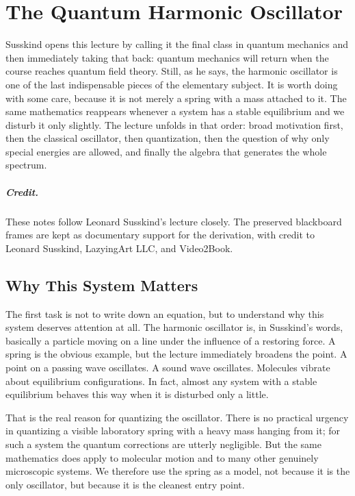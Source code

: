 \chapter{The Quantum Harmonic Oscillator}

Susskind opens this lecture by calling it the final class in quantum mechanics and then immediately taking that back: quantum mechanics will return when the course reaches quantum field theory. Still, as he says, the harmonic oscillator is one of the last indispensable pieces of the elementary subject. It is worth doing with some care, because it is not merely a spring with a mass attached to it. The same mathematics reappears whenever a system has a stable equilibrium and we disturb it only slightly. The lecture unfolds in that order: broad motivation first, then the classical oscillator, then quantization, then the question of why only special energies are allowed, and finally the algebra that generates the whole spectrum.

\paragraph{Credit.} These notes follow Leonard Susskind's lecture closely. The preserved blackboard frames are kept as documentary support for the derivation, with credit to Leonard Susskind, LazyingArt LLC, and Video2Book.

\section{Why This System Matters}

The first task is not to write down an equation, but to understand why this system deserves attention at all. The harmonic oscillator is, in Susskind's words, basically a particle moving on a line under the influence of a restoring force. A spring is the obvious example, but the lecture immediately broadens the point. A point on a passing wave oscillates. A sound wave oscillates. Molecules vibrate about equilibrium configurations. In fact, almost any system with a stable equilibrium behaves this way when it is disturbed only a little.

That is the real reason for quantizing the oscillator. There is no practical urgency in quantizing a visible laboratory spring with a heavy mass hanging from it; for such a system the quantum corrections are utterly negligible. But the same mathematics does apply to molecular motion and to many other genuinely microscopic systems. We therefore use the spring as a model, not because it is the only oscillator, but because it is the cleanest entry point.

